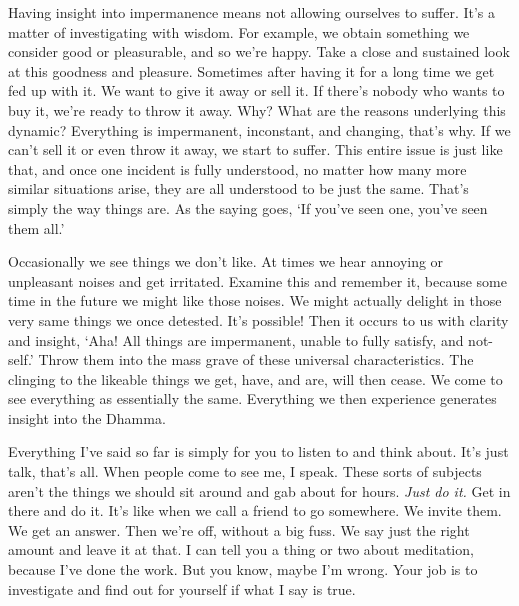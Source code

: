 Having insight into impermanence means not allowing ourselves to suffer. It's a matter of investigating with wisdom. For example, we obtain something we consider good or pleasurable, and so we're happy. Take a close and sustained look at this goodness and pleasure. Sometimes after having it for a long time we get fed up with it. We want to give it away or sell it. If there's nobody who wants to buy it, we're ready to throw it away. Why? What are the reasons underlying this dynamic? Everything is impermanent, inconstant, and changing, that's why. If we can't sell it or even throw it away, we start to suffer. This entire issue is just like that, and once one incident is fully understood, no matter how many more similar situations arise, they are all understood to be just the same. That's simply the way things are. As the saying goes, `If you've seen one, you've seen them all.'

Occasionally we see things we don't like. At times we hear annoying or unpleasant noises and get irritated. Examine this and remember it, because some time in the future we might like those noises. We might actually delight in those very same things we once detested. It's possible! Then it occurs to us with clarity and insight, `Aha! All things are impermanent, unable to fully satisfy, and not-self.' Throw them into the mass grave of these universal characteristics. The clinging to the likeable things we get, have, and are, will then cease. We come to see everything as essentially the same. Everything we then experience generates insight into the Dhamma.

Everything I've said so far is simply for you to listen to and think about. It's just talk, that's all. When people come to see me, I speak. These sorts of subjects aren't the things we should sit around and gab about for hours. \textit{Just do it.} Get in there and do it. It's like when we call a friend to go somewhere. We invite them. We get an answer. Then we're off, without a big fuss. We say just the right amount and leave it at that. I can tell you a thing or two about meditation, because I've done the work. But you know, maybe I'm wrong. Your job is to investigate and find out for yourself if what I say is true.
